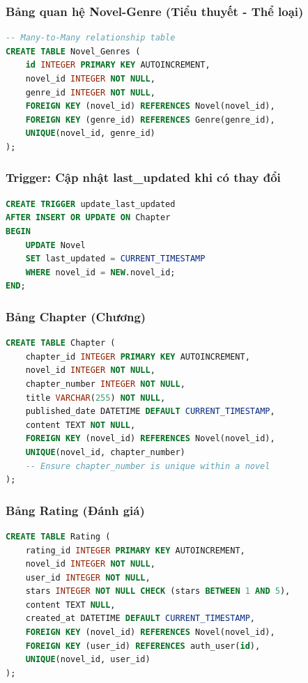 \documentclass[12pt,aspectratio=169,handout]{beamer}
\begin{document}
\begin{frame}[fragile]
\frametitle{Bảng quan hệ Novel-Genre (Tiểu thuyết - Thể loại)}
\begin{lstlisting}[language=SQL, basicstyle=\small\ttfamily]
-- Many-to-Many relationship table
CREATE TABLE Novel_Genres (
    id INTEGER PRIMARY KEY AUTOINCREMENT,
    novel_id INTEGER NOT NULL,
    genre_id INTEGER NOT NULL,
    FOREIGN KEY (novel_id) REFERENCES Novel(novel_id),
    FOREIGN KEY (genre_id) REFERENCES Genre(genre_id),
    UNIQUE(novel_id, genre_id)
);
\end{lstlisting}
\end{frame}

\begin{frame}[fragile]
\frametitle{Trigger: Cập nhật last\_updated khi có thay đổi}
\begin{lstlisting}[language=SQL, basicstyle=\small\ttfamily]
CREATE TRIGGER update_last_updated
AFTER INSERT OR UPDATE ON Chapter
BEGIN
    UPDATE Novel
    SET last_updated = CURRENT_TIMESTAMP
    WHERE novel_id = NEW.novel_id;
END;
\end{lstlisting}
\end{frame}

\begin{frame}[fragile]
\frametitle{Bảng Chapter (Chương)}
\begin{lstlisting}[language=SQL, basicstyle=\small\ttfamily]
CREATE TABLE Chapter (
    chapter_id INTEGER PRIMARY KEY AUTOINCREMENT,
    novel_id INTEGER NOT NULL,
    chapter_number INTEGER NOT NULL,
    title VARCHAR(255) NOT NULL,
    published_date DATETIME DEFAULT CURRENT_TIMESTAMP,
    content TEXT NOT NULL,
    FOREIGN KEY (novel_id) REFERENCES Novel(novel_id),
    UNIQUE(novel_id, chapter_number)
    -- Ensure chapter_number is unique within a novel
);
\end{lstlisting}
\end{frame}

\begin{frame}[fragile]
\frametitle{Bảng Rating (Đánh giá)}
\begin{lstlisting}[language=SQL, basicstyle=\small\ttfamily]
CREATE TABLE Rating (
    rating_id INTEGER PRIMARY KEY AUTOINCREMENT,
    novel_id INTEGER NOT NULL,
    user_id INTEGER NOT NULL,
    stars INTEGER NOT NULL CHECK (stars BETWEEN 1 AND 5),
    content TEXT NULL,
    created_at DATETIME DEFAULT CURRENT_TIMESTAMP,
    FOREIGN KEY (novel_id) REFERENCES Novel(novel_id),
    FOREIGN KEY (user_id) REFERENCES auth_user(id),
    UNIQUE(novel_id, user_id)
);
\end{lstlisting}
\end{frame}
\end{document}
